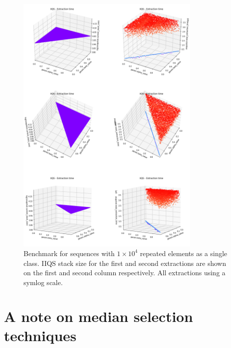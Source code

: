\begin{figure}[!ht]
    \centering
    \includegraphics[width=0.8\textwidth]{./fragments/04_experimental_execution/images/04_alphabeta_singleclass_stack.png}
    \caption{Benchmark for sequences with $1\times10^4$ repeated elements as a single class. IIQS stack size for the first and second extractions are shown on the first and second column respectively. All extractions using a symlog scale.}
    \label{FIG:05_ALPHABETA_RELATIONSHIP_SINGLECLASS_STACK}
\end{figure}


\section{A note on median selection techniques}

